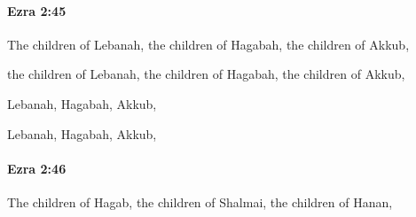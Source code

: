 		\paragraph{Ezra 2:45} %
			\label{EZRA-2-45}

			The children of Lebanah, the children of Hagabah, the children of Akkub,

			\begin{versebox}
					\item[BHS] 
					\item[LXX] 
					\item[ASV] the children of Lebanah, the children of Hagabah, the children of Akkub,
					\item[NIV] Lebanah, Hagabah, Akkub,
					\item[NRSV] Lebanah, Hagabah, Akkub,
			\end{versebox}

		\paragraph{Ezra 2:46} %
			\label{EZRA-2-46}

			The children of Hagab, the children of Shalmai, the children of Hanan,

